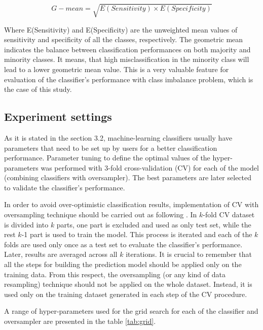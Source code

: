 \documentclass[remotesensing,article,submit,moreauthors,pdftex]{Definitions/mdpi}
\begin{document}
\begin{itemize}
	\begin{equation}
	G{-}mean = \sqrt{E(Sensitivity) \times E(Specificity)}
	\end{equation}

	Where E(Sensitivity) and E(Specificity) are the unweighted mean values of
	sensitivity and specificity of all the classes, respectively. The geometric
	mean indicates the balance between classification performances on both
	majority and minority classes. It means, that high misclassification in the
	minority class will lead to a lower geometric mean value. This is a very
	valuable feature for evaluation of the classifier's performance with class
	imbalance problem, which is the case of this study.

\end{itemize}

\subsection{Experiment settings}

As it is stated in the section 3.2, machine-learning classifiers usually have
parameters that need to be set up by users for a better classification
performance. Parameter tuning to define the optimal values of the
hyper-parameters was performed with 3-fold cross-validation (CV) for each of the
model (combining classifiers with oversampler). The best parameters are later
selected to validate the classifier's performance.

In order to avoid over-optimistic classification results, implementation of CV
with oversampling technique should be carried out as following \cite{Lusa2015}.
In $k$-fold CV dataset is divided into $k$ parts, one part is excluded and used
as only test set, while the rest $k$-1 part is used to train the model. This
process is iterated and each of the $k$ folds are used only once as a test set
to evaluate the classifier's performance. Later, results are averaged across all
$k$ iterations. It is crucial to remember that all the steps for building the
prediction model should be applied only on the training data. From this respect,
the oversampling (or any kind of data resampling) technique should not be
applied on the whole dataset. Instead, it is used only on the training dataset
generated in each step of the CV procedure.

A range of hyper-parameters used for the grid search for each of the classifier
and oversampler are presented in the table \ref{tab:grid}.
\end{document}
